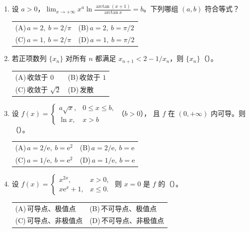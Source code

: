 \documentclass[UTF8,a4paper,zihao=-4,fontset=fandol]{ctexart}
\makeatletter
\newcommand{\choices}[4]{%
  \par\noindent\begin{tabularx}{\linewidth}{@{}X@{\hspace{1em}}X@{}}
    (A)\,#1 & (B)\,#2 \\
    (C)\,#3 & (D)\,#4
  \end{tabularx}\par}
\makeatother
\begin{document}
\begin{enumerate}
\item 设 $a>0$，$\displaystyle\lim_{x\to+\infty}x^a
\ln\frac{\arctan(x+1)}{\arctan x}=b$。下列哪组 $(a,b)$ 符合等式？
\choices{$a=2,\ b=2/\pi$}{$a=2,\ b=\pi/2$}{$a=1,\ b=2/\pi$}{$a=1,\ b=\pi/2$}
\item 若正项数列 $\{x_n\}$ 对所有 $n$ 都满足 $x_{n+1}<2-1/x_n$，则 $\{x_n\}$（\quad）。
\choices{收敛于 $0$}{收敛于 $1$}{收敛于 $\sqrt 2$}{发散}
\item 设 $f(x)=\begin{cases}a\sqrt{x},&0\le x\le b,\\\ln x,&x>b\end{cases}$（$b>0$），
且 $f$ 在 $(0,+\infty)$ 内可导。则（\quad）。
\choices{$a=2/\mathrm e,\ b=\mathrm e^2$}{$a=2/\mathrm e,\ b=\mathrm e$}
{$a=1/\mathrm e,\ b=\mathrm e^2$}{$a=1/\mathrm e,\ b=\mathrm e$}
\item 设 $f(x)=\begin{cases}x^{2x},&x>0,\\x\mathrm{e}^x+1,&x\le0.\end{cases}$
则 $x=0$ 是 $f$ 的（\quad）。
\choices{可导点、极值点}{不可导点、极值点}{可导点、非极值点}{不可导点、非极值点}
\end{enumerate}
\end{document}
